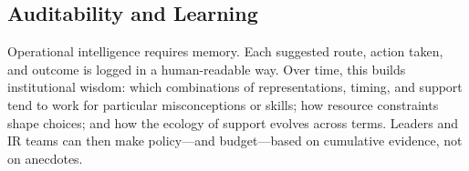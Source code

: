 \subsection{Auditability and Learning}

Operational intelligence requires memory. Each suggested route, action taken, and outcome is logged in a human-readable way. Over time, this builds institutional wisdom: which combinations of representations, timing, and support tend to work for particular misconceptions or skills; how resource constraints shape choices; and how the ecology of support evolves across terms. Leaders and IR teams can then make policy---and budget---based on cumulative evidence, not on anecdotes.


